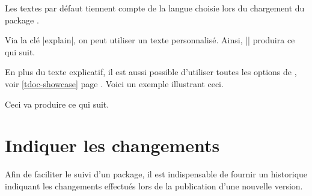 \begin{tdocnote}
    Les textes par défaut tiennent compte de la langue choisie lors du chargement du package \thispack{}.
\end{tdocnote}




\begin{tdocexa}
    Via la clé \tdocinlatex|explain|, on peut utiliser un texte personnalisé. Ainsi, \tdocinlatex|| produira ce qui suit.

    \medskip

    \begin{tdoc-doc-showcase}

    \end{tdoc-doc-showcase}
\end{tdocexa}




\begin{tdocexa}
    En plus du texte explicatif, il est aussi possible d'utiliser toutes les options de , voir \ref{tdoc-showcase} page \pageref{tdoc-showcase}.
    Voici un exemple illustrant ceci.

    \medskip



    \medskip

    Ceci va produire ce qui suit.

    \medskip

    \begin{tdoc-doc-showcase}
        

    \end{tdoc-doc-showcase}
\end{tdocexa}


\section{Indiquer les changements}

Afin de faciliter le suivi d'un package, il est indispensable de fournir un historique indiquant les changements effectués lors de la publication d'une nouvelle version.




